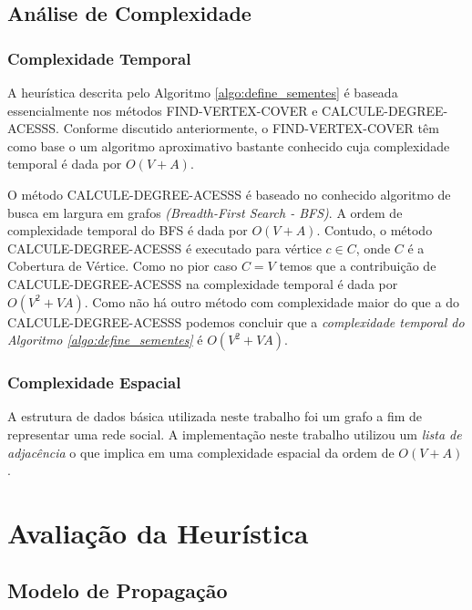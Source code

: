 \documentclass[12pt]{article}
\begin{document}
\subsection{Análise de Complexidade}
\label{subsec:analise_complexidade}

\subsubsection{Complexidade Temporal}
\label{subsubsec:complex_temporal}

A heurística descrita pelo Algoritmo \ref{algo:define_sementes} é baseada essencialmente nos métodos \textsc{FIND-VERTEX-COVER} e \textsc{CALCULE-DEGREE-ACESSS}{}. Conforme discutido anteriormente, o  \textsc{FIND-VERTEX-COVER} têm como base o um algoritmo aproximativo bastante conhecido \cite{Cormen:2009:IAT:1614191}{} cuja complexidade temporal é dada por $O(V+A)$.

O método \textsc{CALCULE-DEGREE-ACESSS}{} é baseado no conhecido algoritmo de busca em largura em grafos \textit{(Breadth-First Search - BFS)}. A ordem de complexidade temporal do BFS é dada por $O(V+A)$. Contudo, o método \textsc{CALCULE-DEGREE-ACESSS}{} é executado para vértice $c \in C$, onde $C$ é a Cobertura de Vértice. Como no pior caso $C = V$ temos que a contribuição de \textsc{CALCULE-DEGREE-ACESSS}{} na complexidade temporal é dada por $O(V^{2}+VA)${}. Como não há outro método com complexidade maior do que a do \textsc{CALCULE-DEGREE-ACESSS}{} podemos concluir que a \textit{complexidade temporal do Algoritmo \ref{algo:define_sementes}} é $O(V^{2}+VA)${}.

\subsubsection{Complexidade Espacial}
\label{subsubsec:complex_espacial}


A estrutura de dados básica utilizada neste trabalho foi um grafo a fim de representar uma rede social. A implementação neste trabalho utilizou um \textit{lista de adjacência} o que implica em uma complexidade espacial da ordem de $O(V+A)${}.


\section{Avaliação da Heurística}
\label{sec:avaliacao}

\subsection{Modelo de Propagação}
\label{subsec:modelo_propagacao}
\end{document}

